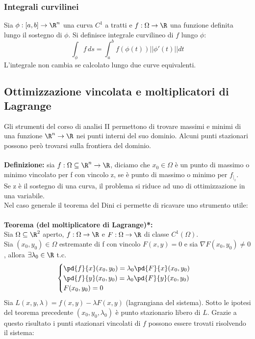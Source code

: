 \documentclass{article}
\begin{document}
\subsubsection{Integrali curvilinei}
Sia $\phi:[a,b]\rightarrow\R^n$ una curva $C^1$ a tratti e $f:\Omega\rightarrow\R$ una funzione definita lungo il sostegno di $\phi$. Si definisce integrale curvilineo di $f$ lungo $\phi$:
$$ \int_\phi f\,ds=\int_a^bf(\phi(t))||\phi'(t)||dt $$
L'integrale non cambia se calcolato lungo due curve equivalenti. 




\subsection{Ottimizzazione vincolata e moltiplicatori di Lagrange}
Gli strumenti del corso di analisi II permettono di trovare massimi e minimi di una funzione $\R^n\rightarrow\R$ nei punti interni del suo dominio. Alcuni punti stazionari possono però trovarsi sulla frontiera del dominio.\\\\
\textbf{Definizione:} sia $f:\Omega\subseteq\R^n\rightarrow\R$, diciamo che $x_0\in\Omega$ è un punto di massimo o minimo vincolato per f con vincolo z, se è punto di massimo o minimo per $f_{|_z}$.\\
Se z è il sostegno di una curva, il problema si riduce ad uno di ottimizzazione in una variabile.\\
Nel caso generale il teorema del Dini ci permette di ricavare uno strumento utile:\\\\
\textbf{Teorema (del moltiplicatore di Lagrange)*:}\\
Sia $\Omega\subseteq\R^2$ aperto, $f:\Omega\rightarrow\R$ e $F:\Omega\rightarrow\R$ di classe $C^1(\Omega)$.\\
Sia $(x_0,y_0)\in\Omega$ estremante di f con vincolo $F(x,y)=0$ e sia $\nabla F(x_0,y_0)\neq0$, allora $\exists\lambda_0\in\R$ t.c.
\begin{equation*}
    \begin{cases}
    \pd{f}{x}(x_0,y_0)=\lambda_0\pd{F}{x}(x_0,y_0)\\
    \pd{f}{y}(x_0,y_0)=\lambda_0\pd{F}{y}(x_0,y_0)\\
    F(x_0,y_0)=0
    \end{cases}
\end{equation*}
Sia $L(x,y,\lambda)=f(x,y)-\lambda F(x,y)$ (lagrangiana del sistema). Sotto le ipotesi del teorema precedente $(x_0,y_0,\lambda_0)$ è punto stazionario libero di $L$. Grazie a questo risultato i punti stazionari vincolati di $f$ possono essere trovati risolvendo il sistema:
\end{document}

